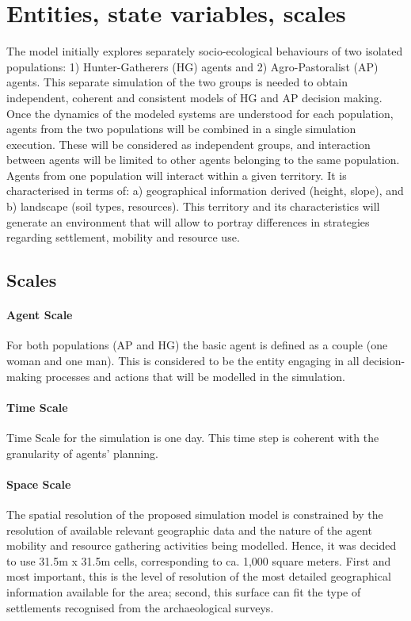 \section{Entities, state variables, scales}
The model initially explores separately socio-ecological behaviours of two isolated populations: 1)
Hunter-Gatherers (HG) agents and 2) Agro-Pastoralist (AP) agents. This separate simulation of the
two groups is needed to obtain independent, coherent and consistent models of HG and AP decision
making. Once the dynamics of the modeled systems are understood for each population, agents from
the two populations will be combined in a single simulation execution. These will be considered as
independent groups, and interaction between agents will be limited to other agents belonging to the
same population.
Agents from one population will interact within a given territory. It is characterised in terms of: a)
geographical information derived (height, slope), and b) landscape (soil types, resources). This
territory and its characteristics will generate an environment that will allow to portray differences in
strategies regarding settlement, mobility and resource use.

\subsection{Scales}
\paragraph{Agent Scale}

For both populations (AP and HG) the basic agent is defined as a couple (one woman and one man).
This is considered to be the entity engaging in all decision-making processes and actions that will be
modelled in the simulation.

\paragraph{Time Scale}
Time Scale for the simulation is one day. This time step is coherent with the granularity of agents’
planning.
\paragraph{Space Scale}
The spatial resolution of the proposed simulation model is constrained by the resolution of available
relevant geographic data and the nature of the agent mobility and resource gathering activities being
modelled.
Hence, it was decided to use 31.5m x 31.5m cells, corresponding to ca. 1,000 square meters. First
and most important, this is the level of resolution of the most detailed geographical information
available for the area; second, this surface can fit the type of settlements recognised from the
archaeological surveys.

